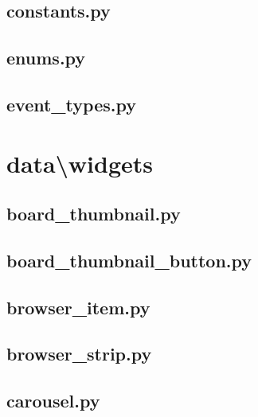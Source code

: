 \documentclass[../main/main.tex]{subfiles}
\begin{document}
\subsection{constants.py}

\label{src:data/utils/constants.py}

\subsection{enums.py}

\label{src:data/utils/enums.py}

\subsection{event\_types.py}

\label{src:data/utils/event_types.py}

\section{data\textbackslash widgets}
\label{src:widgets}
\subsection{board\_thumbnail.py}

\label{src:data/widgets/board_thumbnail.py}

\subsection{board\_thumbnail\_button.py}

\label{src:data/widgets/board_thumbnail_button.py}

\subsection{browser\_item.py}

\label{src:data/widgets/browser_item.py}

\subsection{browser\_strip.py}

\label{src:data/widgets/browser_strip.py}

\subsection{carousel.py}

\label{src:data/widgets/carousel.py}
\end{document}
